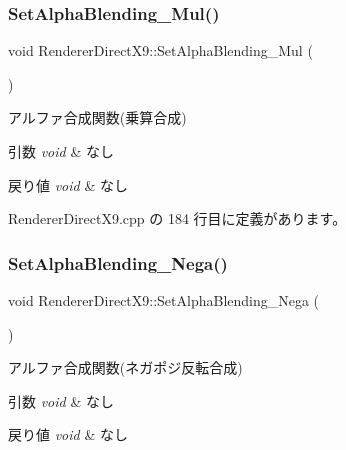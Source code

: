 \subsubsection{\texorpdfstring{Set\+Alpha\+Blending\+\_\+\+Mul()}{SetAlphaBlending\_Mul()}}
{\footnotesize\ttfamily void Renderer\+Direct\+X9\+::\+Set\+Alpha\+Blending\+\_\+\+Mul (\begin{DoxyParamCaption}{ }\end{DoxyParamCaption})}



アルファ合成関数(乗算合成) 


\begin{DoxyParams}{引数}
{\em void} & なし \\
\hline
\end{DoxyParams}

\begin{DoxyRetVals}{戻り値}
{\em void} & なし \\
\hline
\end{DoxyRetVals}


 Renderer\+Direct\+X9.\+cpp の 184 行目に定義があります。

\mbox{\label{class_renderer_direct_x9_a5018efa829bf845405ac70beef7df947}} 
\subsubsection{\texorpdfstring{Set\+Alpha\+Blending\+\_\+\+Nega()}{SetAlphaBlending\_Nega()}}
{\footnotesize\ttfamily void Renderer\+Direct\+X9\+::\+Set\+Alpha\+Blending\+\_\+\+Nega (\begin{DoxyParamCaption}{ }\end{DoxyParamCaption})}



アルファ合成関数(ネガポジ反転合成) 


\begin{DoxyParams}{引数}
{\em void} & なし \\
\hline
\end{DoxyParams}

\begin{DoxyRetVals}{戻り値}
{\em void} & なし \\
\hline
\end{DoxyRetVals}


